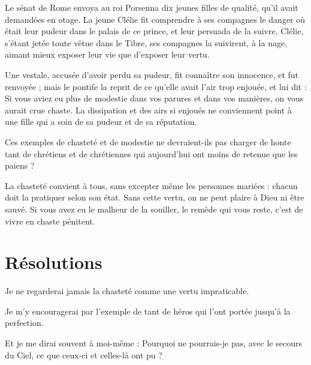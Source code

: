 \documentclass[instructions.tex]{subfiles}
\begin{document}
Le sénat de Rome envoya au roi Porsenna dix jeunes filles de qualité, qu’il avait demandées en otage. La jeune Clélie fit comprendre à ses compagnes le danger où était leur pudeur dans le palais de ce prince, et leur persuada de la suivre. Clélie, s’étant jetée toute vêtue dans le Tibre, ses compagnes la suivirent, à la nage, aimant mieux exposer leur vie que d’exposer leur vertu.
 
Une vestale, accusée d’avoir perdu sa pudeur, fit connaître son innocence, et fut renvoyée ; mais le pontife la reprit de ce qu’elle avait l’air trop enjouée, et lui dit : Si vous aviez eu plus de modestie dans vos parures et dans vos manières, on vous aurait crue chaste. La dissipation et des airs si enjoués ne conviennent point à une fille qui a soin de sa pudeur et de sa réputation.
 
Ces exemples de chasteté et de modestie ne devraient-ils pas charger de honte tant de chrétiens et de chrétiennes qui aujourd’hui ont moins de retenue que les paiens ?
 
La chasteté convient à tous, sans excepter même les personnes mariées : chacun doit la pratiquer selon son état. Sans cette vertu, on ne peut plaire à Dieu ni être sauvé. Si vous avez eu le malheur de la souiller, le remède qui vous reste, c’est de vivre en chaste pénitent.
 
\section{Résolutions}
 
\primo Je ne regarderai jamais la chasteté comme une vertu impraticable.
 
\secundo Je m’y encouragerai par l’exemple de tant de héros qui l’ont portée jusqu’à la perfection.
 
\tertio Et je me dirai souvent à moi-même : Pourquoi ne pourrais-je pas, avec le secours du Ciel, ce que ceux-ci et celles-là ont pu ? 

 
\end{document}
